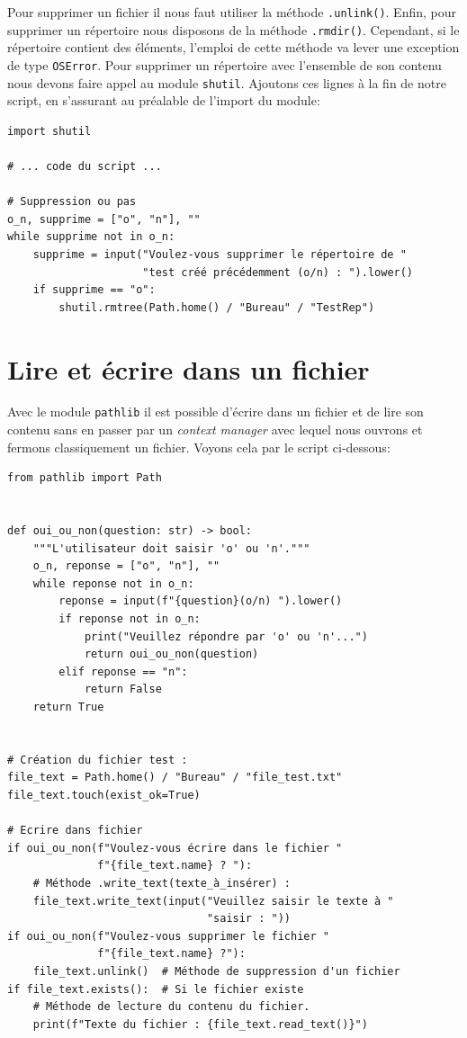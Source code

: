 \documentclass[a4paper,12pt]{book}
\begin{document}
Pour supprimer un fichier il nous faut utiliser la méthode \texttt{.unlink()}. Enfin, pour supprimer un répertoire nous disposons de la méthode \texttt{.rmdir()}. Cependant, si le répertoire contient des éléments, l'emploi de cette méthode va lever une exception de type \texttt{OSError}. Pour supprimer un répertoire avec l'ensemble de son contenu nous devons faire appel au module \texttt{shutil}. Ajoutons ces lignes à la fin de notre script, en s'assurant au préalable de l'import du module:
\begin{lstlisting}[caption=La méthode \texttt{.rmtree()} du module \texttt{shutil}]
import shutil

# ... code du script ...

# Suppression ou pas
o_n, supprime = ["o", "n"], ""
while supprime not in o_n:
    supprime = input("Voulez-vous supprimer le répertoire de "
                     "test créé précédemment (o/n) : ").lower()
    if supprime == "o":
        shutil.rmtree(Path.home() / "Bureau" / "TestRep")
\end{lstlisting}
\medskip

\section{Lire et écrire dans un fichier}
Avec le module \texttt{pathlib} il est possible d'écrire dans un fichier  et de lire son contenu sans en passer par un \textit{context manager} avec lequel nous ouvrons et fermons classiquement un fichier. Voyons cela par le script ci-dessous:
\begin{lstlisting}[caption=Ecriture dans un fichier de type \texttt{.txt}] 
from pathlib import Path


def oui_ou_non(question: str) -> bool:
    """L'utilisateur doit saisir 'o' ou 'n'."""
    o_n, reponse = ["o", "n"], ""
    while reponse not in o_n:
        reponse = input(f"{question}(o/n) ").lower()
        if reponse not in o_n:
            print("Veuillez répondre par 'o' ou 'n'...")
            return oui_ou_non(question)
        elif reponse == "n":
            return False
    return True


# Création du fichier test :
file_text = Path.home() / "Bureau" / "file_test.txt"
file_text.touch(exist_ok=True)

# Ecrire dans fichier
if oui_ou_non(f"Voulez-vous écrire dans le fichier "
              f"{file_text.name} ? "):
    # Méthode .write_text(texte_à_insérer) :
    file_text.write_text(input("Veuillez saisir le texte à "
                               "saisir : "))
if oui_ou_non(f"Voulez-vous supprimer le fichier "
              f"{file_text.name} ?"):
    file_text.unlink()  # Méthode de suppression d'un fichier
if file_text.exists():  # Si le fichier existe
    # Méthode de lecture du contenu du fichier.
    print(f"Texte du fichier : {file_text.read_text()}")
\end{lstlisting}
\medskip
\end{document}
